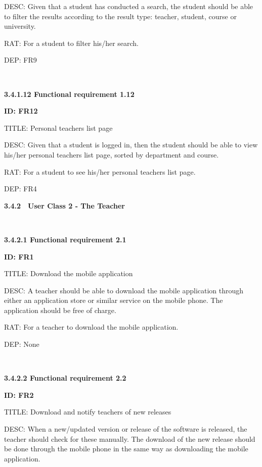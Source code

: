 \documentclass[12pt,a4paper]{article}
\begin{document}
\begin{flushleft}
        DESC: Given that a student has conducted a search, the student should be
        able to filter the results according to the result type: teacher,
        student, course or university.

        RAT: For a student to filter his/her search.

        DEP: FR9


        \
\newpage


        \textbf{3.4.1.12 Functional requirement 1.12}

        \textbf{ID: FR12}

        TITLE: Personal teachers list page

        DESC: Given that a student is logged in, then the student should be able
        to view his/her personal teachers list page, sorted by department and
        course.

        RAT: For a student to see his/her personal teachers list page.

        DEP: FR4




        \newpage


        \textbf{3.4.2}\ \ \textbf{User Class 2 - The Teacher}

        \

        \textbf{3.4.2.1 Functional requirement 2.1}

        \textbf{ID: FR1}

        TITLE: Download the mobile application

        DESC: A teacher should be able to download the mobile application
        through either an application store or similar service on the mobile
        phone. The application should be free of charge.

        RAT: For a teacher to download the mobile application.

        DEP: None

        \

        \textbf{3.4.2.2 Functional requirement 2.2}

        \textbf{ID: FR2}

        TITLE: Download and notify teachers of new releases

        DESC: When a new/updated version or release of the software is released,
        the teacher should check for these manually. The download of the new
        release should be done through the mobile phone in the same way as
        downloading the mobile application.


\end{flushleft}
\end{document}
